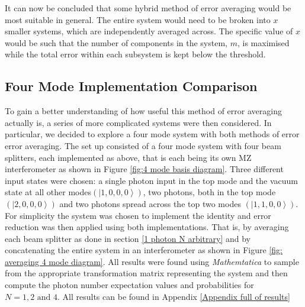 \documentclass[aps,pra,twocolumn,superscriptaddress,numerical]{revtex4-1}
\begin{document}
		
		It can now be concluded that some hybrid method of error averaging would be most suitable in general. The entire system would need to be broken into $x$ smaller systems, which are independently averaged across. The specific value of $x$ would be such that the number of components in the system, $m$, is maximised while the total error within each subsystem is kept below the threshold.
		
		\subsection{Four Mode Implementation Comparison \label{Four Mode Impementation Comparison}}
		
		To gain a better understanding of how useful this method of error averaging actually is, a series of more complicated systems were then considered. In particular, we decided to explore a four mode system with both methods of error error averaging. The set up consisted of a four mode system with four beam splitters, each implemented as above, that is each being its own MZ interferometer as shown in Figure \ref{fig:4 mode basis diagram}. Three different input states were chosen: a single photon input in the top mode and the vacuum state at all other modes$\left(\left|1,0,0,0\right\rangle \right)$, two photons, both in the top mode $\left(\left|2,0,0,0\right\rangle \right)$ and two photons spread across the top two modes $\left(\left|1,1,0,0\right\rangle \right)$. For simplicity the system was chosen to implement the identity and error reduction was then applied using both implementations. That is, by averaging each beam splitter as done in section \ref{1 photon N arbitrary} and by concatenating the entire system in an interferometer as shown in Figure \ref{fig: averaging 4 mode diagram}. All results were found using \textit{Mathemtatica} to sample from the appropriate transformation matrix representing the system and then compute the photon number expectation values and probabilities for $N=1, 2 \textrm{ and } 4$. All results can be found in Appendix \ref{Appendix full of results}
		
\end{document}
